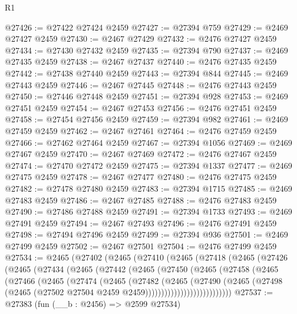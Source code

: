 \begin{lexlean}{R1}
\begin{coremodule}
@27426 := @27422 @27424 @2459
@27427 := @27394 @759
@27429 := @2469 @27427 @2459
@27430 := @2467 @27429
@27432 := @2476 @27427 @2459
@27434 := @27430 @27432 @2459
@27435 := @27394 @790
@27437 := @2469 @27435 @2459
@27438 := @2467 @27437
@27440 := @2476 @27435 @2459
@27442 := @27438 @27440 @2459
@27443 := @27394 @844
@27445 := @2469 @27443 @2459
@27446 := @2467 @27445
@27448 := @2476 @27443 @2459
@27450 := @27446 @27448 @2459
@27451 := @27394 @928
@27453 := @2469 @27451 @2459
@27454 := @2467 @27453
@27456 := @2476 @27451 @2459
@27458 := @27454 @27456 @2459
@27459 := @27394 @982
@27461 := @2469 @27459 @2459
@27462 := @2467 @27461
@27464 := @2476 @27459 @2459
@27466 := @27462 @27464 @2459
@27467 := @27394 @1056
@27469 := @2469 @27467 @2459
@27470 := @2467 @27469
@27472 := @2476 @27467 @2459
@27474 := @27470 @27472 @2459
@27475 := @27394 @1337
@27477 := @2469 @27475 @2459
@27478 := @2467 @27477
@27480 := @2476 @27475 @2459
@27482 := @27478 @27480 @2459
@27483 := @27394 @1715
@27485 := @2469 @27483 @2459
@27486 := @2467 @27485
@27488 := @2476 @27483 @2459
@27490 := @27486 @27488 @2459
@27491 := @27394 @1733
@27493 := @2469 @27491 @2459
@27494 := @2467 @27493
@27496 := @2476 @27491 @2459
@27498 := @27494 @27496 @2459
@27499 := @27394 @936
@27501 := @2469 @27499 @2459
@27502 := @2467 @27501
@27504 := @2476 @27499 @2459
@27534 := @2465
    (@27402
      (@2465
        (@27410
          (@2465
            (@27418
              (@2465
                (@27426
                  (@2465
                    (@27434
                      (@2465
                        (@27442
                          (@2465
                            (@27450
                              (@2465
                                (@27458
                                  (@2465
                                    (@27466
                                      (@2465
                                        (@27474
                                          (@2465
                                            (@27482
                                              (@2465
                                                (@27490
                                                  (@2465
                                                    (@27498
                                                      (@2465
                                                        (@27502
                                                          @27504
                                                          @2459
                                                          @2459)))))))))))))))))))))))))))
@27537 := @27383 (fun (__b : @2456) => @2599 @27534)

\end{coremodule}
\end{lexlean}
